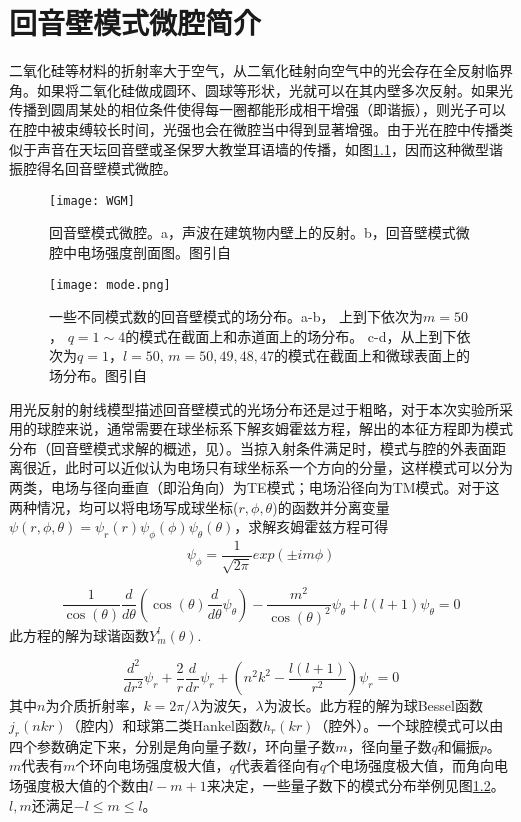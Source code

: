 \chapter{回音壁模式微腔简介}
\label{sec:WGM}

二氧化硅等材料的折射率大于空气，从二氧化硅射向空气中的光会存在全反射临界角。如果将二氧化硅做成圆环、圆球等形状，光就可以在其内壁多次反射。如果光传播到圆周某处的相位条件使得每一圈都能形成相干增强（即谐振），则光子可以在腔中被束缚较长时间，光强也会在微腔当中得到显著增强。由于光在腔中传播类似于声音在天坛回音壁或圣保罗大教堂耳语墙的传播，如图\ref{pic:WGM}，因而这种微型谐振腔得名回音壁模式微腔。

\begin{figure}
\centering
\texttt{[image: WGM]}
\caption{回音壁模式微腔。a，声波在建筑物内壁上的反射。b，回音壁模式微腔中电场强度剖面图。图引自\cite{LiBeiBei2014}}
\label{pic:WGM}
\end{figure}

\begin{figure}
\centering
\texttt{[image: mode.png]}
\caption{一些不同模式数的回音壁模式的场分布。a-b， 上到下依次为$m = 50$， $q= 1\sim4$的模式在截面上和赤道面上的场分布。 c-d，从上到下依次为$q = 1$，$l = 50$,  $m = 50, 49, 48, 47$的模式在截面上和微球表面上的场分布。图引自\cite{LiBeiBei2014}}
\label{pic:mode}
\end{figure}

用光反射的射线模型描述回音壁模式的光场分布还是过于粗略，对于本次实验所采用的球腔来说，通常需要在球坐标系下解亥姆霍兹方程，解出的本征方程即为模式分布（回音壁模式求解的概述，见\cite{oraevsky2002whispering}）。当掠入射条件满足时，模式与腔的外表面距离很近，此时可以近似认为电场只有球坐标系一个方向的分量，这样模式可以分为两类，电场与径向垂直（即沿角向）为TE模式；电场沿径向为TM模式。对于这两种情况，均可以将电场写成球坐标($r, \phi, \theta$)的函数并分离变量$\psi(r, \phi, \theta) = \psi_r(r)\psi_{\phi}(\phi)\psi_{\theta}(\theta)$，求解亥姆霍兹方程可得
\begin{equation}
\psi_{\phi} = \frac{1}{\sqrt{2\pi}}exp(\pm im\phi)
\end{equation}

\begin{equation}
\frac{1}{\cos(\theta)}\frac{d}{d\theta}(\cos(\theta)\frac{d}{d\theta}\psi_{\theta})-\frac{m^2}{\cos(\theta)^2}\psi_{\theta}+l(l+1)\psi_{\theta} = 0
\end{equation}
此方程的解为球谐函数$Y^l_m(\theta)$.

\begin{equation}
\frac{d^2}{dr^2}\psi_r+\frac{2}{r}\frac{d}{dr}\psi_r+(n^2k^2-\frac{l(l+1)}{r^2})\psi_r = 0
\end{equation}
其中$n$为介质折射率，$k=2\pi/\lambda$为波矢，$\lambda$为波长。此方程的解为球Bessel函数$j_r(nkr)$（腔内）和球第二类Hankel函数$h_r(kr)$（腔外）。一个球腔模式可以由四个参数确定下来，分别是角向量子数$l$，环向量子数$m$，径向量子数$q$和偏振$p$。$m$代表有$m$个环向电场强度极大值，$q$代表着径向有$q$个电场强度极大值，而角向电场强度极大值的个数由$l-m+1$来决定，一些量子数下的模式分布举例见图\ref{pic:mode}。$l, m$还满足$-l\le m\le l$。
